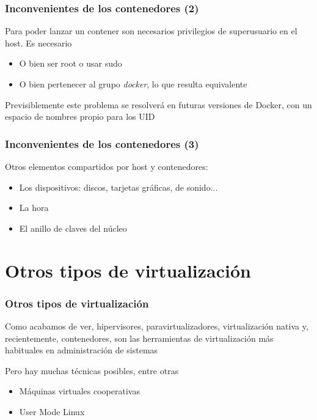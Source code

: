 \documentclass[ucs]{beamer}
\begin{document}
\begin{frame}[fragile]
\frametitle{Inconvenientes de los contenedores (2)}


Para poder lanzar un contener son necesarios privilegios de superusuario
en el host. Es necesario 
\begin{itemize}
\item
O bien ser root o usar sudo
\item
O bien pertenecer al grupo \emph{docker}, lo que resulta equivalente
\end{itemize}


Previsiblemente este problema se resolverá en futuras versiones
de Docker, con un espacio de nombres propio para los UID



\end{frame}
\begin{frame}[fragile]
\frametitle{Inconvenientes de los contenedores (3)}


Otros elementos compartidos por host y contenedores:
\begin{itemize}
\item
Los dispositivos: discos, tarjetas gráficas, de sonido... 

\item
La hora 

\item
El anillo de claves del núcleo 
\end{itemize}

\end{frame}




\section{Otros tipos de virtualización}


\begin{frame}[fragile]
\frametitle{Otros tipos de virtualización}

Como acabamos de ver, hipervisores, paravirtualizadores, virtualización nativa y, recientemente,
contenedores, son las herramientas de virtualización más habituales en administración
de sistemas

Pero hay muchas técnicas posibles, entre otras
\begin{itemize}
\item
Máquinas virtuales cooperativas
\item
User Mode Linux
\end{itemize}

\end{frame}
\end{document}
